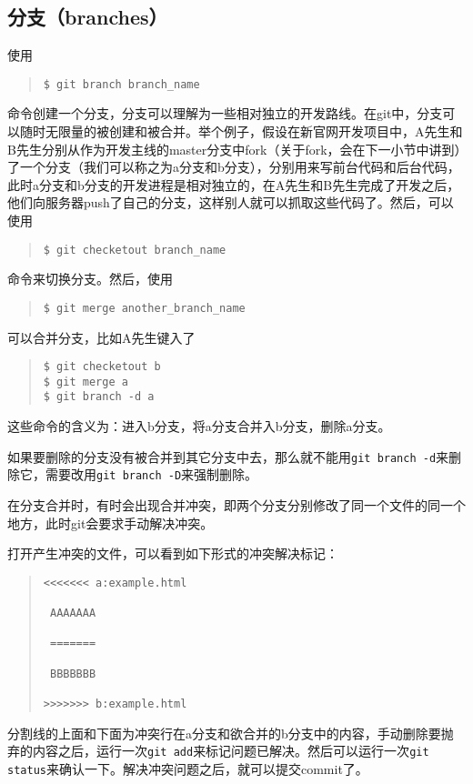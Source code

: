 \documentclass{article}
\begin{document}
		\subsection{分支（branches）} %
		\label{sub:分支}
			使用
			\begin{quote}
				\begin{lstlisting}
$ git branch branch_name
				\end{lstlisting}
			\end{quote}
			命令创建一个分支，分支可以理解为一些相对独立的开发路线。在git中，分支可以随时无限量的被创建和被合并。举个例子，假设在新官网开发项目中，A先生和B先生分别从作为开发主线的master分支中fork（关于fork，会在下一小节中讲到）了一个分支（我们可以称之为a分支和b分支），分别用来写前台代码和后台代码，此时a分支和b分支的开发进程是相对独立的，在A先生和B先生完成了开发之后，他们向服务器push了自己的分支，这样别人就可以抓取这些代码了。然后，可以使用
			\begin{quote}
				\begin{lstlisting}
$ git checketout branch_name
				\end{lstlisting}
			\end{quote}
			命令来切换分支。然后，使用
			\begin{quote}
				\begin{lstlisting}
$ git merge another_branch_name
				\end{lstlisting}
			\end{quote}
			可以合并分支，比如A先生键入了
			\begin{quote}
				\begin{lstlisting}
$ git checketout b 
$ git merge a
$ git branch -d a
				\end{lstlisting}
			\end{quote}
			这些命令的含义为：进入b分支，将a分支合并入b分支，删除a分支。
			\par 如果要删除的分支没有被合并到其它分支中去，那么就不能用{\tt git branch -d}来删除它，需要改用{\tt git branch -D}来强制删除。
			\par 在分支合并时，有时会出现合并冲突，即两个分支分别修改了同一个文件的同一个地方，此时git会要求手动解决冲突。
			\par 打开产生冲突的文件，可以看到如下形式的冲突解决标记：
			\begin{quote}
				\begin{lstlisting}
<<<<<<< a:example.html

 AAAAAAA

 ======= 

 BBBBBBB

>>>>>>> b:example.html
				\end{lstlisting}
			\end{quote}
			分割线的上面和下面为冲突行在a分支和欲合并的b分支中的内容，手动删除要抛弃的内容之后，运行一次{\tt git add}来标记问题已解决。然后可以运行一次{\tt git status}来确认一下。解决冲突问题之后，就可以提交commit了。
\end{document}
